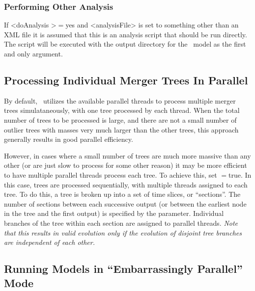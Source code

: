 \subsubsection{Performing Other Analysis}

If {\normalfont \ttfamily \textless doAnalysis \textgreater}$=${\normalfont \ttfamily yes} and {\normalfont \ttfamily \textless analysisFile\textgreater} is set to something other than an XML file it is assumed that this is an analysis script that should be run directly. The script will be executed with the output directory for the \glc\ model as the first and only argument.

\subsection{Processing Individual Merger Trees In Parallel}

By default, \glc\ utilizes the available parallel threads to process multiple merger trees simulataneously, with one tree processed by each thread. When the total number of trees to be processed is large, and there are not a small number of outlier trees with masses very much larger than the other trees, this approach generally results in good parallel efficiency.

However, in cases where a small number of trees are much more massive than any other (or are just slow to process for some other reason) it may be more efficient to have multiple parallel threads process each tree. To achieve this, set {\normalfont \ttfamily [treeEvolveSingleForest]}$=${\normalfont \ttfamily true}. In this case, trees are processed sequentially, with multiple threads assigned to each tree. To do this, a tree is broken up into a set of time slices, or ``sections''. The number of sections between each successive output (or between the earliest node in the tree and the first output) is specified by the {\normalfont \ttfamily [treeEvolveSingleForestSections]} parameter. Individual branches of the tree within each section are assigned to parallel threads. \emph{Note that this results in valid evolution only if the evolution of disjoint tree branches are independent of each other.}

\subsection{Running Models in ``Embarrassingly Parallel'' Mode}

